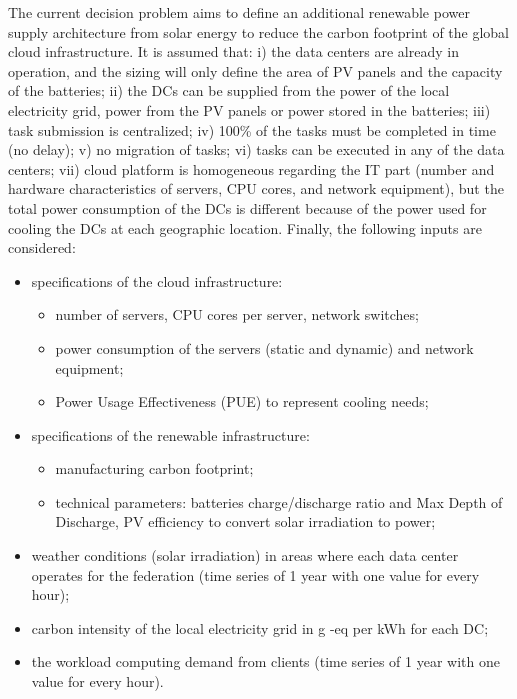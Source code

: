 The current decision problem aims to define an additional renewable power supply architecture from solar energy to reduce the carbon footprint of the global cloud infrastructure. It is assumed that: i) the data centers are already in operation, and the sizing will only define the area of PV panels and the capacity of the batteries; ii) the DCs can be supplied from the power of the local electricity grid, power from the PV panels or power stored in the batteries; iii) task submission is centralized; iv) 
100\% of the tasks must be completed in time (no delay); v) no migration of tasks; vi) tasks can be executed in any of the data centers; vii) cloud platform is homogeneous regarding the IT part (number and hardware characteristics of servers, CPU cores, and network equipment), but the total power consumption of the DCs is different because of the power used for cooling the DCs at each geographic location. Finally, the following inputs are considered:


\begin{itemize}
    \item specifications of the cloud infrastructure:
    \begin{itemize}
        \item number of servers, CPU cores per server, network switches;
        \item power consumption of the servers (static and dynamic) and network equipment;
        \item Power Usage Effectiveness (PUE) to represent cooling needs;
    \end{itemize}
    
    \item specifications of the renewable infrastructure:
    \begin{itemize}
        \item manufacturing carbon footprint;
        \item technical parameters: batteries charge/discharge ratio and Max Depth of Discharge, PV efficiency to convert solar irradiation to power;
    \end{itemize}
    \item weather conditions (solar irradiation) in areas where each data center operates for the federation (time series of 1 year with one value for every hour);
    \item carbon intensity of the local electricity grid in g -eq per kWh for each DC;
    \item the workload computing demand from clients (time series of 1 year with one value for every hour).
\end{itemize}

